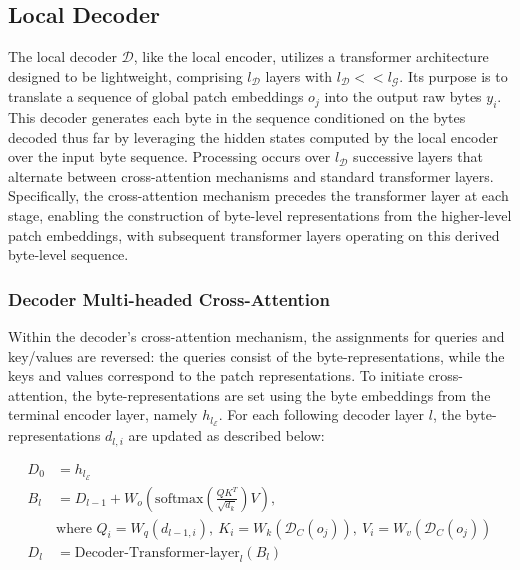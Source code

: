 \subsection{Local Decoder} 

The local decoder $\mathcal{D}$, like the local encoder, utilizes a transformer architecture designed to be lightweight, comprising $l_{\mathcal{D}}$ layers with $l_{\mathcal{D}} << l_{\mathcal{G}}$. Its purpose is to translate a sequence of global patch embeddings $o_j$ into the output raw bytes $y_i$. This decoder generates each byte in the sequence conditioned on the bytes decoded thus far by leveraging the hidden states computed by the local encoder over the input byte sequence. Processing occurs over $l_{\mathcal{D}}$ successive layers that alternate between cross-attention mechanisms and standard transformer layers. Specifically, the cross-attention mechanism precedes the transformer layer at each stage, enabling the construction of byte-level representations from the higher-level patch embeddings, with subsequent transformer layers operating on this derived byte-level sequence.

\subsubsection{Decoder Multi-headed Cross-Attention} 

Within the decoder's cross-attention mechanism, the assignments for queries and key/values are reversed: the queries consist of the byte-representations, while the keys and values correspond to the patch representations. To initiate cross-attention, the byte-representations are set using the byte embeddings from the terminal encoder layer, namely $h_{l_{\mathcal{E}}}$. For each following decoder layer $l$, the byte-representations $d_{l,i}$ are updated as described below:

\begin{align}
D_0 &= h_{l_{\mathcal{E}}} \\
B_l &= D_{l-1} + W_o\left(\text{softmax}\left(\frac{QK^T}{\sqrt{d_k}}\right)V\right), \\
  &\text{where } Q_i = W_q(d_{l-1,i}),\ K_i = W_k(\mathcal{D}_C(o_j)),\ V_i = W_v(\mathcal{D}_C(o_j)) \\
  D_l &= \text{Decoder-Transformer-layer}_l(B_l)
\end{align}

